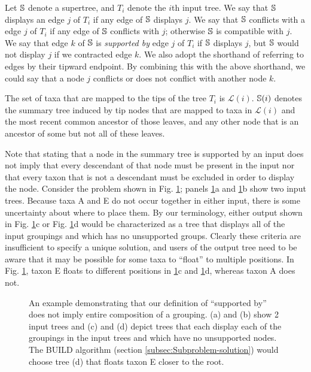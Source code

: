\documentclass[fleqn,12pt,lineno,english]{wlpeerj}
\begin{document}
Let $\mathbb{S}$ denote a supertree, and $T_{i}$ denote the $i$th
input tree. We say that $\mathbb{S}$ displays an edge $j$ of $T_{i}$
if any edge of $\mathbb{S}$ displays $j$. We say that $\mathbb{S}$
conflicts with a edge $j$ of $T_{i}$ if any edge of $\mathbb{S}$
conflicts with $j$; otherwise $\mathbb{S}$ is compatible with
$j$. We say that edge $k$ of $\mathbb{S}$ is \emph{supported
by} edge $j$ of $T_{i}$ if $\mathbb{S}$ displays $j$, but $\mathbb{S}$
would not display $j$ if we contracted edge $k$. We also adopt the
shorthand of referring to edges by their tipward endpoint. By combining
this with the above shorthand, we could say that a node $j$ conflicts
or does not conflict with another node $k$.

The set of taxa that are mapped to the tips of the tree $T_{i}$ is
$\mathcal{L}(i)$. $\mathbb{S}(i)$ denotes the summary tree induced
by tip nodes that are mapped to taxa in $\mathcal{L}(i)$ and the
most recent common ancestor of those leaves, and any other node that
is an ancestor of some but not all of these leaves. 

Note that stating that a node in the summary tree is supported by
an input does not imply that every descendant of that node must be
present in the input nor that every taxon that is not a descendant
must be excluded in order to display the node. Consider the problem
shown in Fig. \ref{fig:toyambig}; panels \ref{fig:toyambig}a
and \ref{fig:toyambig}b show two input trees. Because taxa A and
E do not occur together in either input, there is some uncertainty
about where to place them. By our terminology, either output shown
in Fig. \ref{fig:toyambig}c or Fig. \ref{fig:toyambig}d would be characterized
as a tree that displays all of the input groupings and which has no
unsupported groups. Clearly these criteria are insufficient to specify
a unique solution, and users of the output tree need to be aware that
it may be possible for some taxa to ``float'' to multiple positions.
In Fig. \ref{fig:toyambig}, taxon E floats to different positions
in \ref{fig:toyambig}c and \ref{fig:toyambig}d, whereas taxon
A does not. 

\begin{figure}
\hfill{}

\hfill{}

\caption{An example demonstrating that our definition of ``supported by''
does not imply entire composition of a grouping. (a) and (b) show
2 input trees and (c) and (d) depict trees that each display each
of the groupings in the input trees and which have no unsupported
nodes. The BUILD algorithm (section \ref{subsec:Subproblem-solution})
would choose tree (d) that floats taxon E closer to the root.}

\label{fig:toyambig}
\end{figure}
\end{document}
